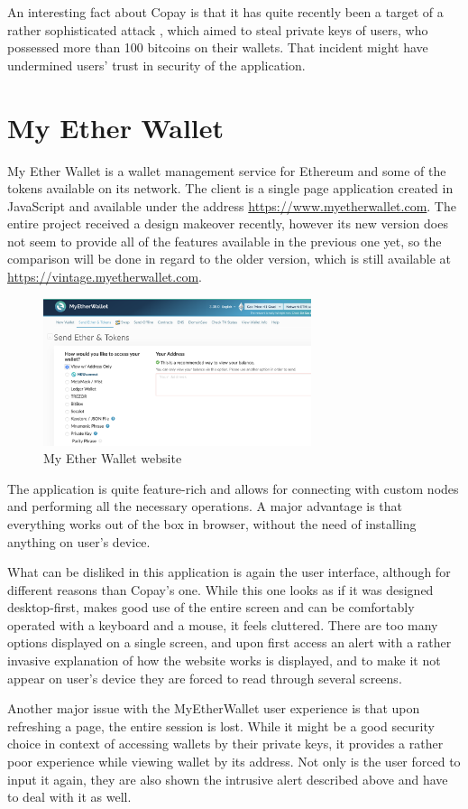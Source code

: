 An interesting fact about Copay is that it has quite recently been
a target of a rather sophisticated attack \cite{copay-attack},
which aimed to steal private keys of users, who possessed more than
100 bitcoins on their wallets.
That incident might have undermined users' trust
in security of the application.

\section{My Ether Wallet}

My Ether Wallet is a wallet management service for Ethereum
and some of the tokens available on its network.
The client is a single page application created in JavaScript
and available under the address \url{https://www.myetherwallet.com}.
The entire project received a design makeover recently,
however its new version does not seem to provide all of the features
available in the previous one yet, so the comparison will be done
in regard to the older version, which is still available at
\url{https://vintage.myetherwallet.com}.

\begin{figure}[ht]
    \centering
    \includegraphics[width=0.7\textwidth]{assets/mew.png}
    \caption{My Ether Wallet website}
    \label{3:fig:mew}
\end{figure}

\newpage

The application is quite feature-rich and allows for connecting
with custom nodes and performing all the necessary operations.
A major advantage is that everything works out of the box
in browser, without the need of installing anything on user's device.

What can be disliked in this application is again the user interface,
although for different reasons than Copay's one.
While this one looks as if it was designed desktop-first, makes good use
of the entire screen and can be comfortably operated with a keyboard and a mouse,
it feels cluttered.
There are too many options displayed on a single screen,
and upon first access an alert with a rather invasive explanation
of how the website works is displayed,
and to make it not appear on user's device
they are forced to read through several screens.

Another major issue with the MyEtherWallet user experience
is that upon refreshing a page, the entire session is lost.
While it might be a good security choice in context of
accessing wallets by their private keys,
it provides a rather poor experience while viewing
wallet by its address.
Not only is the user forced to input it again,
they are also shown the intrusive alert described above
and have to deal with it as well.
